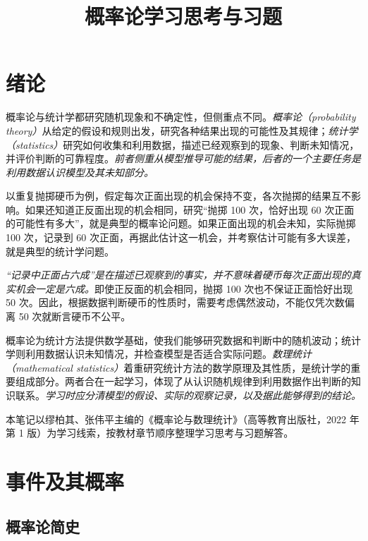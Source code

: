 \documentclass[UTF8,12pt,a4paper,fontset=fandol]{ctexbook}
\title{概率论学习思考与习题}
\author{}
\date{}
\begin{document}
\maketitle

\frontmatter
\tableofcontents

\chapter{绪论}

概率论与统计学都研究随机现象和不确定性，但侧重点不同。\emph{概率论（probability theory）}从给定的假设和规则出发，研究各种结果出现的可能性及其规律；\emph{统计学（statistics）}研究如何收集和利用数据，描述已经观察到的现象、判断未知情况，并评价判断的可靠程度。\emph{前者侧重从模型推导可能的结果，后者的一个主要任务是利用数据认识模型及其未知部分。}

以重复抛掷硬币为例，假定每次正面出现的机会保持不变，各次抛掷的结果互不影响。如果还知道正反面出现的机会相同，研究“抛掷 100 次，恰好出现 60 次正面的可能性有多大”，就是典型的概率论问题。如果正面出现的机会未知，实际抛掷 100 次，记录到 60 次正面，再据此估计这一机会，并考察估计可能有多大误差，就是典型的统计学问题。

\emph{“记录中正面占六成”是在描述已观察到的事实，并不意味着硬币每次正面出现的真实机会一定是六成。}即使正反面的机会相同，抛掷 100 次也不保证正面恰好出现 50 次。因此，根据数据判断硬币的性质时，需要考虑偶然波动，不能仅凭次数偏离 50 次就断言硬币不公平。

概率论为统计方法提供数学基础，使我们能够研究数据和判断中的随机波动；统计学则利用数据认识未知情况，并检查模型是否适合实际问题。\emph{数理统计（mathematical statistics）}着重研究统计方法的数学原理及其性质，是统计学的重要组成部分。两者合在一起学习，体现了从认识随机规律到利用数据作出判断的知识联系。\emph{学习时应分清模型的假设、实际的观察记录，以及据此能够得到的结论。}

本笔记以缪柏其、张伟平主编的《概率论与数理统计》（高等教育出版社，2022 年第 1 版）为学习线索，按教材章节顺序整理学习思考与习题解答。

\mainmatter

\chapter{事件及其概率}
\label{chap:study-events}

\section{概率论简史}
\label{sec:study-probability-history}
\end{document}
